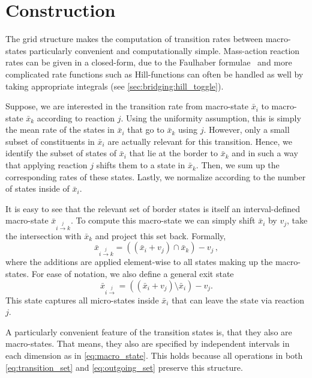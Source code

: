 \section{Construction}
The grid structure makes the computation of transition rates between macro-states particularly convenient and computationally simple.
Mass-action reaction rates can be given in a closed-form,
due to the Faulhaber formulae~\cite{knuth1993johann} and more complicated rate functions such as Hill-functions can often be handled as well by taking appropriate integrals (see \autoref{sec:bridging:hill_toggle}).

Suppose, we are interested in the transition rate from macro-state $\bar{x}_i$ to macro-state $\bar{x}_k$ according to reaction $j$.
Using the uniformity assumption, this is simply the mean rate of the states in $\bar{x}_i$ that go to $\bar{x}_k$ using $j$.
However, only a small subset of constituents in $\bar{x}_i$ are actually relevant for this transition.
Hence, we identify the subset of states of $\bar{x}_i$ that lie at the border to $\bar{x}_k$ and in such a way that applying reaction $j$ shifts them to a state in $\bar{x}_k$. Then, we sum up the corresponding rates of these states. Lastly, we normalize according to the number of states inside of $\bar{x}_i$.

It is easy to see that the relevant set of border states is itself an
interval-defined macro-state $\bar{x}_{i\xrightarrow{j}k}$.
To compute this macro-state
we can simply shift $\bar{x}_i$ by $v_j$, take the intersection
with $\bar{x}_k$ and project this set back.
Formally,
\begin{equation}\label{eq:transition_set}
    \bar{x}_{i\xrightarrow{j}k} = ((\bar{x}_i + v_j) \cap \bar{x}_k) - v_j\,,
\end{equation}
where the additions are applied element-wise to all states
making up the macro-states.
For ease of notation, we also define a general exit state
\begin{equation}\label{eq:outgoing_set}
    \bar{x}_{i\xrightarrow{j}} = ((\bar{x}_i + v_j) \setminus \bar{x}_i) - v_j.
\end{equation}
This state captures all micro-states inside $\bar{x}_i$ that can leave the state via reaction $j$.

A particularly convenient feature of the transition states is, that they also are macro-states.
That means, they also are specified by independent intervals in each dimension as in \eqref{eq:macro_state}.
This holds because all operations in both \eqref{eq:transition_set} and \eqref{eq:outgoing_set} preserve this structure.

